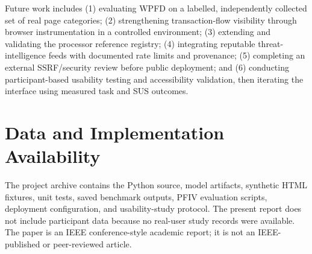 \documentclass[conference]{IEEEtran}
\begin{document}
Future work includes (1) evaluating WPFD on a labelled, independently collected set of real page categories; (2) strengthening transaction-flow visibility through browser instrumentation in a controlled environment; (3) extending and validating the processor reference registry; (4) integrating reputable threat-intelligence feeds with documented rate limits and provenance; (5) completing an external SSRF/security review before public deployment; and (6) conducting participant-based usability testing and accessibility validation, then iterating the interface using measured task and SUS outcomes.

\section*{Data and Implementation Availability}
The project archive contains the Python source, model artifacts, synthetic HTML fixtures, unit tests, saved benchmark outputs, PFIV evaluation scripts, deployment configuration, and usability-study protocol. The present report does not include participant data because no real-user study records were available. The paper is an IEEE conference-style academic report; it is not an IEEE-published or peer-reviewed article.
\end{document}
